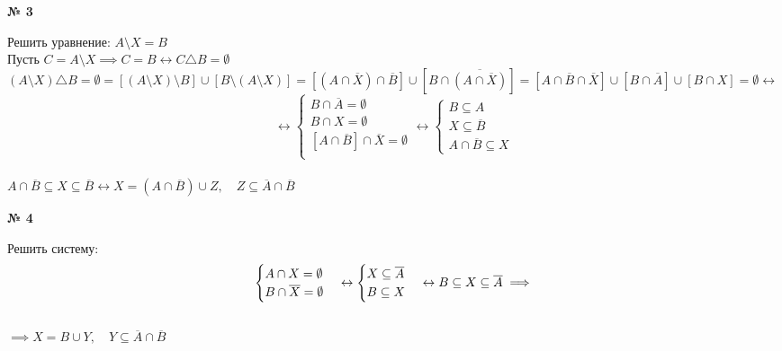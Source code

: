 \documentclass[12pt]{article}
\begin{document}
\vspace{.5cm}
{
	{\textbf{№ 3} \vspace{.5cm}\\}
	\large{ Решить уравнение: $A \setminus X = B$\\
		Пусть $C = A \setminus X \implies C = B \leftrightarrow C \triangle B = \emptyset$\\
		$(A \setminus X) \triangle B = \emptyset = [(A \setminus X) \setminus B] \cup [B \setminus (A \setminus X)] = [(A \cap	\overline{X}) \cap \overline{B}] \cup [B \cap \overline{(A \cap \overline{X})}] = [A \cap \overline{B} \cap \overline{X}] \cup [B \cap \overline{A}] \cup [B \cap X] = \emptyset \leftrightarrow$\\
		\begin{equation*}
			\leftrightarrow
			\begin{cases}
				B \cap \overline{A} = \emptyset\\
				B \cap X = \emptyset\\
				[A \cap \overline{B}] \cap \overline{X} = \emptyset\\
			\end{cases}
		\leftrightarrow
		\begin{cases}
			B \subseteq A \text{}\\
		    X \subseteq \overline{B}\\
			A \cap \overline{B} \subseteq X
		\end{cases}
		\end{equation*}\\
	$A \cap \overline{B} \subseteq X \subseteq \overline{B} \leftrightarrow X = (A \cap \overline{B}) \cup Z, \quad Z \subseteq \overline{A} \cap \overline{B}$
		

	}
}

\vspace{.5cm}
{
	{\textbf{№ 4} \vspace{.5cm}\\}
	\large{ Решить систему:
		\begin{equation*}
			\begin{cases}
				A \cap X = \emptyset\\
				B \cap \overline{X} = \emptyset
			\end{cases} \leftrightarrow
		\begin{cases}
			X \subseteq \overline{A}\\
			B \subseteq X
		\end{cases} \leftrightarrow
		B \subseteq X \subseteq \overline{A} \implies\\
		\end{equation*}\\
	$\implies X = B \cup Y, \quad Y \subseteq \overline{A} \cap \overline{B}$
		
	}
}
\end{document}
